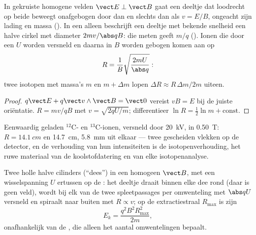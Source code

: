 \begin{proposition}\label{prop:b1:charged-particles:spectrometer}
In gekruiste homogene velden $\vect E \perp \vect B$ gaat een deeltje dat
loodrecht op beide beweegt onafgebogen door dan en slechts dan als $v = E/B$, ongeacht zijn
lading en massa (\emph{}). In een  alleen beschrijft een
deeltje met bekende snelheid een halve cirkel met diameter $2mv/\abs qB$:
die meten geeft $m/q$ (\emph{}). Ionen die door een
 $U$ worden versneld en daarna in $B$ worden gebogen komen aan op
\[
R = \frac{1}{B}\sqrt{\frac{2mU}{\abs q}} :
\]
twee isotopen met massa's $m$ en $m + \Delta m$ lopen $\Delta R \approx
R\,\Delta m/2m$ uiteen.
\end{proposition}

\begin{proof}
$q\vect E + q\vect v\wedge\vect B = \vect 0$ vereist $vB = E$ bij de juiste
oriëntatie. $R = mv/qB$ met $v = \sqrt{2qU/m}$; differentieer
$\ln R = \tfrac12\ln m + \text{const}$.
\end{proof}

\begin{example}[Koolstofisotopen]\label{ex:b1:charged-particles:isotopes}
Eenwaardig geladen $^{12}$C- en $^{13}$C-ionen, versneld door \qty{20}{kV},
in \qty{0.50}{T}: $R = \qty{14.1}{cm}$ en \qty{14.7}{cm}, \qty{5.8}{mm}
uit elkaar --- twee gescheiden vlekken op de detector, en de verhouding van hun
intensiteiten is de isotopenverhouding, het ruwe materiaal van de
koolstofdatering en van elke isotopenanalyse.
\end{example}

\begin{proposition}[Cyclotron]\label{prop:b1:charged-particles:cyclotron}
Twee holle halve cilinders (``dees'') in een homogeen $\vect B$, met een
wisselspanning $U$ ertussen op de : het
deeltje draait binnen elke dee rond (daar is geen veld), wordt bij elk van de
twee spleetpassages per omwenteling met $\abs qU$ versneld en spiraalt naar buiten
met $R \propto v$; op de extractiestraal $R_{\max}$ is zijn 
\[
E_k = \frac{q^2B^2R_{\max}^2}{2m},
\]
onafhankelijk van de , die alleen het aantal omwentelingen bepaalt.
\end{proposition}

